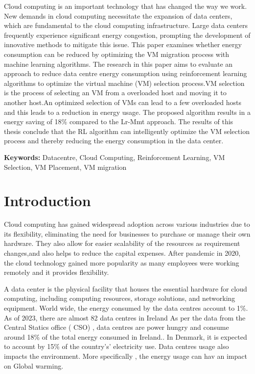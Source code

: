 \documentclass[a4paper,12pt]{Classes/RoboticsLaTeX}
\begin{document}
	\newpage\textbf{}
	
	
	\begin{abstracts}
				
		Cloud computing is an important technology that has changed the way we work. New demands in cloud computing necessitate the expansion of data centers, which are fundamental to the cloud computing infrastructure. Large data centers frequently experience significant energy congestion, prompting the development of innovative methods to mitigate this issue. This paper examines whether energy consumption can be reduced by optimizing the VM migration process with machine learning algorithms. The research in this paper aims to evaluate an approach to reduce data centre energy consumption using reinforcement learning algorithms to optimize the virtual machine (VM) selection process.VM selection is the process of selecting an VM from a overloaded host and moving it to another host.An optimized selection of VMs can lead to a few overloaded hosts and this leads to a reduction in energy usage. The proposed algorithm results in a energy saving of 18\% compared to the Lr-Mmt approach. The results of this thesis conclude that the RL algorithm can intelligently optimize the VM selection process and thereby reducing the  energy consumption in the data center. 
        
		
		\textbf{Keywords: } Datacentre, Cloud Computing, Reinforcement Learning, VM Selection, VM Placement, VM migration
	\end{abstracts}
	
	
	\tableofcontents
	\listoffigures
	\listoftables
	\printglossary[title=List of Acronyms,type=\acronymtype]
	
	
	\mainmatter
	
	
	\chapter{Introduction}
	\label{chap:introduction}
    Cloud computing has gained widespread adoption across various industries due to its flexibility, eliminating the need for businesses to purchase or manage their own hardware. They also allow for easier scalability of the resources as requirement changes,and also helps to reduce the capital expenses. After pandemic in 2020, the cloud technology gained more popularity as many employees were working remotely and it provides flexibility.\cite{Wikipedia_2023}
    
    A data center is the physical facility that houses the essential hardware for cloud computing, including computing resources, storage solutions, and networking equipment. \cite{amazonWhatData}
    World wide, the energy consumed by the data centres account to 1\%. As of 2023, there are almost 82 data centres in Ireland \cite{irishtimesDataCentres2} As per the data from the Central Statics office ( CSO) , data centres are power hungry and consume around 18\% of the total energy consumed in Ireland.\cite{irishtimesDataCentres1}. In Denmark, it is expected to account by 15\% of the country’s’ electricity use. Data centres usage also impacts the environment. More specifically , the energy usage can hav an impact on Global warming.\cite{ieaDataCentres}
\end{document}
